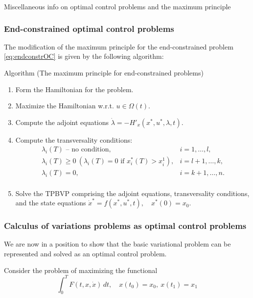\documentclass[10pt]{beamer}
\theoremstyle{definition}
\begin{document}
\begin{section}{Miscellaneous info on optimal control problems and the maximum principle}
\begin{frame}[fragile]
\frametitle{End-constrained optimal control problems}
The modification of the maximum principle for the end-constrained problem \eqref{eq:endconstrOC} is given by the following algorithm:

\begin{block}{Algorithm (The maximum principle for end-constrained problems)}
\begin{enumerate}
\item Form the Hamiltonian for the problem.
\item Maximize the Hamiltonian w.r.t. $ u \in \Omega(t) $.
\item Compute the adjoint equations $ \dot{\lambda} = -H'_x(x^*,u^*,\lambda,t) $.
\item Compute the transversality conditions:
\begin{equation*}
\begin{array}{ll}
\lambda_i(T) \text{ -- no condition},& i=1,\ldots,l,\\
\lambda_i(T) \geq 0~\left(\lambda_i(T) = 0 \text{ if } x^*_i(T) > x^1_i\right),& i=l+1,\ldots,k,\\
\lambda_i(T)=0 ,& i=k+1,\ldots,n.\\
\end{array}
\end{equation*}
\item Solve the TPBVP comprising the adjoint equations, transversality conditions, and the state equations  $ \dot{x}^* = f(x^*,u^*,t), \quad x^*(0)=x_0 $. 
\end{enumerate}
\end{block}
\end{frame}

\begin{frame}[fragile]
\frametitle{Calculus of variations problems as optimal control problems}
We are now in a position to show that the basic variational problem can be represented and solved as an optimal control problem. \bigskip

Consider the problem of maximizing the functional \begin{equation*}
\int_{0}^{T} F(t,x,\dot{x})\,dt,\quad x(t_0)=x_0, ~x(t_1)=x_1
\end{equation*}
\end{frame}







\end{section}
\end{document}
